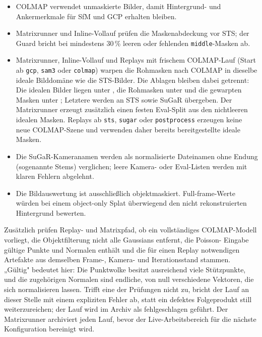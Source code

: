 \begin{itemize}
  \item COLMAP verwendet unmaskierte Bilder, damit Hintergrund- und
        Ankermerkmale für SfM und GCP erhalten bleiben.
  \item Matrixrunner und Inline-Vollauf prüfen die Maskenabdeckung vor STS;
        der Guard bricht bei mindestens 30\,\% leeren oder fehlenden
        \texttt{middle}-Masken ab.
  \item Matrixrunner, Inline-Vollauf und Replays mit frischem COLMAP-Lauf
        (Start ab \texttt{gcp}, \texttt{sam3} oder \texttt{colmap}) warpen die
        Rohmasken nach COLMAP in dieselbe ideale Bilddomäne wie die
        STS-Bilder. Die Ablagen bleiben dabei getrennt: Die idealen Bilder
        liegen unter , die Rohmasken
        unter  und die gewarpten Masken unter
        ; Letztere werden an STS sowie SuGaR
        übergeben. Der Matrixrunner erzeugt zusätzlich einen festen Eval-Split
        aus den nichtleeren idealen Masken. Replays ab \texttt{sts},
        \texttt{sugar} oder \texttt{postprocess} erzeugen keine neue
        COLMAP-Szene und verwenden daher bereits bereitgestellte ideale
        Masken.
  \item Die SuGaR-Kameranamen werden als normalisierte Dateinamen ohne
        Endung (sogenannte Stems) verglichen; leere
        Kamera- oder Eval-Listen werden mit klaren Fehlern abgelehnt.
  \item Die Bildauswertung ist ausschließlich objektmaskiert. Full-frame-Werte
        würden bei einem object-only Splat überwiegend den nicht rekonstruierten
        Hintergrund bewerten.
\end{itemize}

Zusätzlich prüfen Replay- und Matrixpfad, ob ein vollständiges COLMAP-Modell
vorliegt, die Objektfilterung nicht alle Gaussians entfernt, die Poisson-
Eingabe gültige Punkte und Normalen enthält und die für einen Replay
notwendigen Artefakte aus demselben Frame-, Kamera- und Iterationsstand
stammen. „Gültig" bedeutet hier: Die Punktwolke besitzt ausreichend viele
Stützpunkte, und die zugehörigen Normalen sind endliche, von null
verschiedene Vektoren, die sich normalisieren lassen. Trifft eine der
Prüfungen nicht zu, bricht der Lauf an dieser Stelle mit einem expliziten
Fehler ab, statt ein defektes Folgeprodukt still weiterzureichen; der Lauf
wird im Archiv als fehlgeschlagen geführt. Der Matrixrunner archiviert jeden
Lauf, bevor der Live-Arbeitsbereich für die nächste Konfiguration bereinigt
wird.

